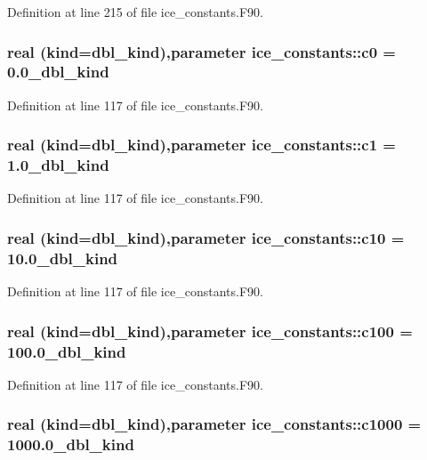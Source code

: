 Definition at line 215 of file ice\_\-constants.F90.\hypertarget{namespaceice__constants_a8320d3c058c4ae0e12bbf1b11305e51e}{
\subsubsection[{c0}]{\setlength{\rightskip}{0pt plus 5cm}real (kind=dbl\_\-kind),parameter {\bf ice\_\-constants::c0} = 0.0\_\-dbl\_\-kind}}
\label{namespaceice__constants_a8320d3c058c4ae0e12bbf1b11305e51e}


Definition at line 117 of file ice\_\-constants.F90.\hypertarget{namespaceice__constants_a74c3f6d59942aec40dda487c6af99039}{
\subsubsection[{c1}]{\setlength{\rightskip}{0pt plus 5cm}real (kind=dbl\_\-kind),parameter {\bf ice\_\-constants::c1} = 1.0\_\-dbl\_\-kind}}
\label{namespaceice__constants_a74c3f6d59942aec40dda487c6af99039}


Definition at line 117 of file ice\_\-constants.F90.\hypertarget{namespaceice__constants_a29dded1ebf63a0561a70a7d94d016fa7}{
\subsubsection[{c10}]{\setlength{\rightskip}{0pt plus 5cm}real (kind=dbl\_\-kind),parameter {\bf ice\_\-constants::c10} = 10.0\_\-dbl\_\-kind}}
\label{namespaceice__constants_a29dded1ebf63a0561a70a7d94d016fa7}


Definition at line 117 of file ice\_\-constants.F90.\hypertarget{namespaceice__constants_a64d8a1f5f872985a8ef291758a414275}{
\subsubsection[{c100}]{\setlength{\rightskip}{0pt plus 5cm}real (kind=dbl\_\-kind),parameter {\bf ice\_\-constants::c100} = 100.0\_\-dbl\_\-kind}}
\label{namespaceice__constants_a64d8a1f5f872985a8ef291758a414275}


Definition at line 117 of file ice\_\-constants.F90.\hypertarget{namespaceice__constants_a489137702b8f265b58dc91f04e4145d4}{
\subsubsection[{c1000}]{\setlength{\rightskip}{0pt plus 5cm}real (kind=dbl\_\-kind),parameter {\bf ice\_\-constants::c1000} = 1000.0\_\-dbl\_\-kind}}
\label{namespaceice__constants_a489137702b8f265b58dc91f04e4145d4}


